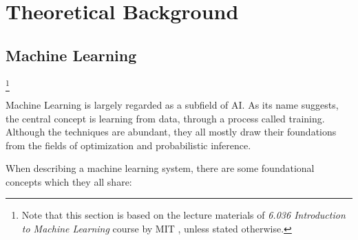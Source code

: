 \section{Theoretical Background}\label{section::theoretical_background}

\subsection{Machine Learning}
\footnote{
Note that this section is based on the lecture materials of \textit{6.036 Introduction to Machine Learning} course by MIT \cite{MITx6.036}, unless stated otherwise.}

Machine Learning is largely regarded as a subfield of AI. As its name suggests, the central concept is learning from data, through a process called training. Although the techniques are abundant, they all mostly draw their foundations from the fields of optimization and probabilistic inference. 

When describing a machine learning system, there are some foundational concepts which they all share:


